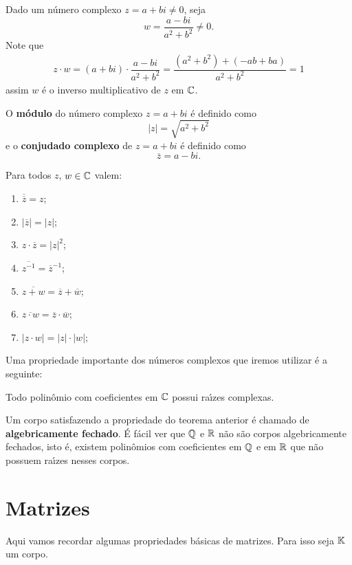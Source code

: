 Dado um n\'umero complexo $z = a + bi \ne 0$, seja
\[
	w = \dfrac{a - bi}{a^2 + b^2} \ne 0.
\]
Note que
\begin{align*}
	z\cdot w = (a + bi)\cdot \dfrac{a - bi}{a^2 + b^2} = \dfrac{(a^2 + b^2) + (-ab + ba)}{a^2 + b^2} = 1
\end{align*}
assim $w$ \'e o inverso multiplicativo de $z$ em $\mathbb{C}$.

O \textbf{m\'odulo} do n\'umero complexo $z = a + bi$ \'e definido como
\[
	|z| = \sqrt{a^2 + b^2}
\]
e o \textbf{conjudado complexo} de $z = a + bi$ \'e definido como
\[
	\overline{z} = a - bi.
\]

\begin{proposicao}
	Para todos $z$, $w \in \mathbb{C}$ valem:
	\begin{enumerate}[label={\roman*})]
		\item $\overline{\overline{z}} = z$;
		\item $|\overline{z}| = |z|$;
		\item $z\cdot\overline{z} = |z|^2$;
		\item $\overline{z^{-1}} = \overline{z}^{-1}$;
		\item $\overline{z + w} = \overline{z} + \overline{w}$;
		\item $\overline{z \cdot w} = \overline{z} \cdot \overline{w}$;
		\item $|z \cdot w| = |z| \cdot |w|$;
	\end{enumerate}
\end{proposicao}

Uma propriedade importante dos n\'umeros complexos que iremos utilizar \'e a seguinte:
\begin{teorema}
	Todo polin\^omio com coeficientes em $\mathbb{C}$ possui ra{\'\i}zes complexas.
\end{teorema}

Um corpo satisfazendo a propriedade do teorema anterior \'e chamado de \textbf{algebricamente fechado}. \'E f\'acil ver que $\mathbb{Q}$ e $\mathbb{R}$ n\~ao s\~ao corpos algebricamente fechados, isto \'e, existem polin\^omios com coeficientes em $\mathbb{Q}$ e em $\mathbb{R}$ que n\~ao possuem ra{\'\i}zes nesses corpos.

\section{Matrizes}

Aqui vamos recordar algumas propriedades b\'asicas de matrizes. Para isso seja $\mathbb{K}$ um corpo.

